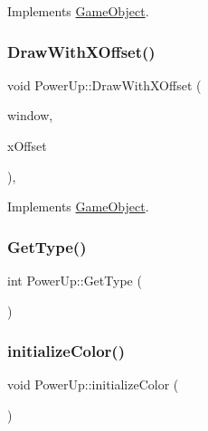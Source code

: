 Implements \hyperlink{class_game_object_a0bd45eb831b3d0959eb498cad3e412ce}{Game\+Object}.

\hypertarget{class_power_up_a4ddb447c9a6bdf1475bc2334590ba55e}{}\label{class_power_up_a4ddb447c9a6bdf1475bc2334590ba55e} 
\subsubsection{\texorpdfstring{Draw\+With\+X\+Offset()}{DrawWithXOffset()}}
{\footnotesize\ttfamily void Power\+Up\+::\+Draw\+With\+X\+Offset (\begin{DoxyParamCaption}\item[{sf\+::\+Render\+Window \&}]{window,  }\item[{float}]{x\+Offset }\end{DoxyParamCaption})\hspace{0.3cm}{\ttfamily [override]}, {\ttfamily [virtual]}}



Implements \hyperlink{class_game_object_a8a3c07e92775fe00baa9e661fefb224e}{Game\+Object}.

\hypertarget{class_power_up_aa4c470221625cfabf02a60e2e386f06f}{}\label{class_power_up_aa4c470221625cfabf02a60e2e386f06f} 
\subsubsection{\texorpdfstring{Get\+Type()}{GetType()}}
{\footnotesize\ttfamily int Power\+Up\+::\+Get\+Type (\begin{DoxyParamCaption}{ }\end{DoxyParamCaption})}

\hypertarget{class_power_up_a3319d56353d0845a1fba25340537d1b9}{}\label{class_power_up_a3319d56353d0845a1fba25340537d1b9} 
\subsubsection{\texorpdfstring{initialize\+Color()}{initializeColor()}}
{\footnotesize\ttfamily void Power\+Up\+::initialize\+Color (\begin{DoxyParamCaption}{ }\end{DoxyParamCaption})}

